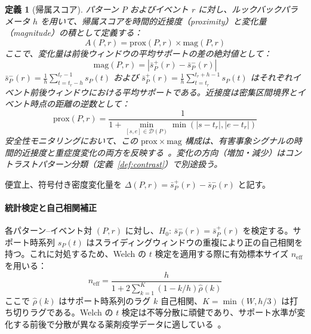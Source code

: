 \documentclass[11pt]{article}
\newtheorem{definition}{定義}
\begin{document}
\begin{definition}[帰属スコア]\label{def:attribution_score}
パターン $P$ およびイベント $r$ に対し、ルックバックパラメータ $h$ を用いて、帰属スコアを時間的近接度（proximity）と変化量（magnitude）の積として定義する：
\begin{equation}
A(P, r) = \mathrm{prox}(P, r) \times \mathrm{mag}(P, r)
\label{eq:attribution}
\end{equation}
ここで、変化量は前後ウィンドウの平均サポートの差の絶対値として：
\begin{equation}
\mathrm{mag}(P, r) = |\bar{s}_P^{+}(r) - \bar{s}_P^{-}(r)|
\label{eq:mag}
\end{equation}
$\bar{s}_P^{-}(r) = \frac{1}{h}\sum_{t=t_r-h}^{t_r-1} s_P(t)$ および $\bar{s}_P^{+}(r) = \frac{1}{h}\sum_{t=t_r}^{t_r+h-1} s_P(t)$ はそれぞれイベント前後ウィンドウにおける平均サポートである。近接度は密集区間境界とイベント時点の距離の逆数として：
\begin{equation}
\mathrm{prox}(P, r) = \frac{1}{1 + \min_{[s,e] \in \mathcal{D}(P)} \min(|s - t_r|, |e - t_r|)}
\label{eq:prox}
\end{equation}
安全性モニタリングにおいて、この $\mathrm{prox} \times \mathrm{mag}$ 構成は、有害事象シグナルの時間的近接度と重症度変化の両方を反映する~\citep{lancaster2018surrogate}。変化の方向（増加・減少）はコントラストパターン分類（定義~\ref{def:contrast}）で別途扱う。
\end{definition}

便宜上、符号付き密度変化量を $\Delta(P, r) = \bar{s}_P^{+}(r) - \bar{s}_P^{-}(r)$ と記す。

\paragraph{統計検定と自己相関補正}
各パターン--イベント対 $(P, r)$ に対し、$H_0$: $\bar{s}_P^{-}(r) = \bar{s}_P^{+}(r)$ を検定する。サポート時系列 $s_P(t)$ はスライディングウィンドウの重複により正の自己相関を持つ。これに対処するため、Welch の $t$ 検定を適用する際に有効標本サイズ $n_{\mathrm{eff}}$ を用いる：
\begin{equation}
n_{\mathrm{eff}} = \frac{h}{1 + 2\sum_{k=1}^{K} (1 - k/h) \hat{\rho}(k)}
\label{eq:neff}
\end{equation}
ここで $\hat{\rho}(k)$ はサポート時系列のラグ $k$ 自己相関、$K = \min(W, h/3)$ は打ち切りラグである。Welch の $t$ 検定は不等分散に頑健であり、サポート水準が変化する前後で分散が異なる薬剤疫学データに適している~\citep{welch1947ttest}。
\end{document}
